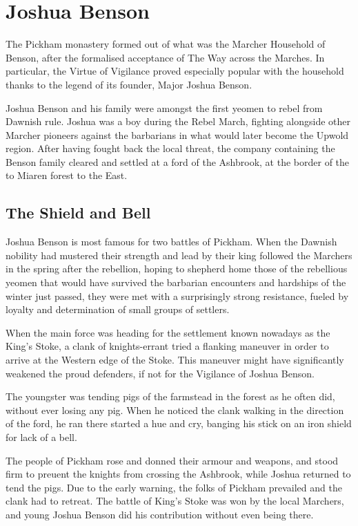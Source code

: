 \section{Joshua Benson}
The Pickham monastery
formed out of what was
the Marcher Household of
Benson, after the formalised
acceptance of The Way across the
Marches. In particular, the Virtue of
Vigilance proved especially popular
with the household thanks to the
legend of its founder, Major Joshua
Benson.

Joshua Benson and his
family were amongst the first
yeomen to rebel from Dawnish rule.
Joshua was a boy during the Rebel
March, fighting alongside other
Marcher pioneers against the
barbarians in what would later
become the Upwold region. After
having fought back the local threat,
the company containing the Benson
family cleared and settled at a ford of
the Ashbrook, at the border of the to
Miaren forest to the East.
\subsection{The Shield and Bell}
Joshua Benson is most famous
for two battles of Pickham.
When the Dawnish nobility
had mustered their strength and lead
by their king followed the Marchers
in the spring after the rebellion,
hoping to shepherd home those of
the rebellious yeomen that would
have survived the barbarian
encounters and hardships of the
winter just passed, they were met
with a surprisingly strong
resistance, fueled by loyalty and
determination of small groups of
settlers.

When the main force
was heading for the settlement
known nowadays as the King’s
Stoke, a clank of knights-errant
tried a flanking maneuver in order
to arrive at the Western edge of the
Stoke. This maneuver might have
significantly weakened the proud
defenders, if not for the Vigilance of
Joshua Benson.

The youngster was
tending pigs of the farmstead in the
forest as he
often did,
without
ever losing
any pig.
When he
noticed the clank
walking in the direction of the ford,
he ran there started a hue and cry,
banging his stick on an iron shield
for lack of a bell.

The people of
Pickham rose and donned their
armour and weapons, and stood
firm to preuent the knights from
crossing the Ashbrook, while Joshua
returned to tend the pigs. Due to the
early warning, the folks of
Pickham prevailed and the clank had
to retreat. The battle of King’s
Stoke was won by the local
Marchers, and young Joshua Benson
did his contribution without even
being there.

